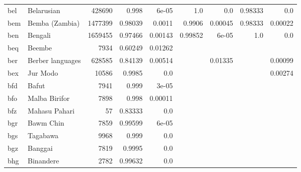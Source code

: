 \documentclass[11pt]{article}
\begin{document}
\begin{table*}[ht]
{\begin{tabular}{llrrrrrrr}
bel         & Belarusian         & 428690         & 0.998         & 6e-05         & 1.0         & 0.0         & 0.98333         & 0.0         \\

bem         & Bemba (Zambia)         & 1477399         & 0.98039         & 0.0011         & 0.9906         & 0.00045         & 0.98333         & 0.00022         \\

ben         & Bengali         & 1659455         & 0.97466         & 0.00143         & 0.99852         & 6e-05         & 1.0         & 0.0         \\

beq         & Beembe         & 7934         & 0.60249         & 0.01262         &          &          &          &          \\

ber         & Berber languages         & 628585         & 0.84139         & 0.00514         &          & 0.01335         &          & 0.00099         \\

bex         & Jur Modo         & 10586         & 0.9985         & 0.0         &          &          &          & 0.00274         \\

bfd         & Bafut         & 7941         & 0.999         & 3e-05         &          &          &          &          \\

bfo         & Malba Birifor         & 7898         & 0.998         & 0.00011         &          &          &          &          \\

bfz         & Mahasu Pahari         & 57         & 0.83333         & 0.0         &          &          &          &          \\

bgr         & Bawm Chin         & 7859         & 0.99599         & 6e-05         &          &          &          &          \\

bgs         & Tagabawa         & 9968         & 0.999         & 0.0         &          &          &          &          \\

bgz         & Banggai         & 7819         & 0.9995         & 0.0         &          &          &          &          \\

bhg         & Binandere         & 2782         & 0.99632         & 0.0         &          &          &          &          \\


\end{tabular}}
\end{table*}
\end{document}
